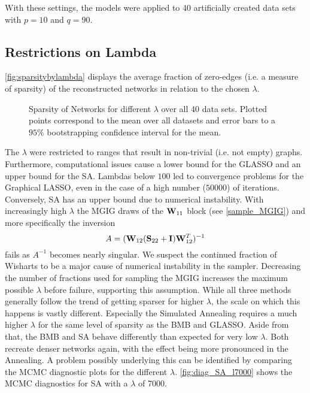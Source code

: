 With these settings, the models were applied to 40 artificially created data sets with $p=10$ and $q=90$.

\subsection{Restrictions on Lambda}
\autoref{fig:sparsitybylambda} displays the average fraction of zero-edges (i.e. a measure of sparsity) of the reconstructed networks in relation to the chosen $\lambda$.
\begin{figure}
	\centering
	
	\caption{Sparsity of Networks for different $\lambda$ over all 40 data sets.
		Plotted points correspond to the mean over all datasets and error bars to a $95\%$ bootstrapping confidence interval for the mean.}
	\label{fig:sparsitybylambda}
\end{figure}
The $\lambda$ were restricted to ranges that result in non-trivial (i.e. not empty) graphs. 
Furthermore, computational issues cause a lower bound for the GLASSO and an upper bound for the SA.
Lambdas below $100$ led to convergence problems for the Graphical LASSO, even in the case of a high number ($50000$) of iterations.
Conversely, SA has an upper bound due to numerical instability.
With increasingly high $\lambda$ the MGIG draws of the $\mathbf{W}_{11}$ block (see \autoref{sample_MGIG}) and more specifically the inversion
$$
A=(\mathbf{W}_{12}(\mathbf{S}_{22}+\mathbf{I})\mathbf{W}_{12}^T)^{-1}
$$
fails as $A^{-1}$ becomes nearly singular.
We suspect the continued fraction of Wisharts to be a major cause of numerical instability in the sampler.
Decreasing the number of fractions used for sampling the MGIG increases the maximum possible $\lambda$ before failure, supporting this assumption.
While all three methods generally follow the trend of getting sparser for higher $\lambda$, the scale on which this happens is vastly different. 
Especially the Simulated Annealing requires a much higher $\lambda$ for the same level of sparsity as the BMB and GLASSO.
Aside from that, the BMB and SA behave differently than expected for very low $\lambda$.
Both recreate denser networks again, with the effect being more pronounced in the Annealing.
A problem possibly underlying this can be identified by comparing the MCMC diagnostic plots for the different $\lambda$.
\autoref{fig:diag_SA_l7000} shows the MCMC diagnostics for SA with a $\lambda$ of 7000.
